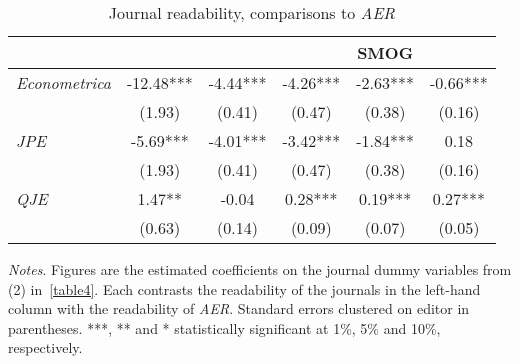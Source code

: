 \begin{table}[H]
    \footnotesize
    \centering
    \begin{threeparttable}
        \caption{Journal readability, comparisons to \textit{AER}}
        \label{tableC3}
        \begin{tabular}{p{2cm}S@{}S@{}S@{}S@{}S@{}}
            \toprule
            &{}&{}&{}&{SMOG}&{}\\
            \midrule
            \textit{Econometrica}         &      -12.48***&       -4.44***&       -4.26***&       -2.63***&       -0.66***\\
                                          &      (1.93)   &      (0.41)   &      (0.47)   &      (0.38)   &      (0.16)   \\
            \textit{JPE}                  &       -5.69***&       -4.01***&       -3.42***&       -1.84***&        0.18   \\
                                          &      (1.93)   &      (0.41)   &      (0.47)   &      (0.38)   &      (0.16)   \\
            \textit{QJE}                  &        1.47** &       -0.04   &        0.28***&        0.19***&        0.27***\\
                                          &      (0.63)   &      (0.14)   &      (0.09)   &      (0.07)   &      (0.05)   \\
            \bottomrule
        \end{tabular}
        \begin{tablenotes}
            \tiny
            \item \textit{Notes}. Figures are the estimated coefficients on the journal dummy variables from (2) in~\autoref{table4}. Each contrasts the readability of the journals in the left-hand column with the readability of \textit{AER}. Standard errors clustered on editor in parentheses. ***, ** and * statistically significant at 1\%, 5\% and 10\%, respectively.
        \end{tablenotes}
    \end{threeparttable}
\end{table}